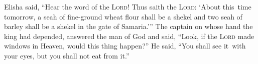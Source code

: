 
\begin{inparaenum}
     Elisha said, ``Hear the word of the \textsc{Lord}! Thus saith the \textsc{Lord}: `About this\understood\ time tomorrow, a seah of fine-ground wheat flour shall be a shekel and two seah of barley shall be a shekel in the gate of Samaria.'\thinspace''%
     The captain on whose hand the king had depended, answered the man of God and said, ``Look, if the \textsc{Lord} made windows in Heaven, would this thing happen?'' He said, ``You shall see it\understood\ with your eyes, but you shall not eat from it.''%
    

\end{inparaenum}
